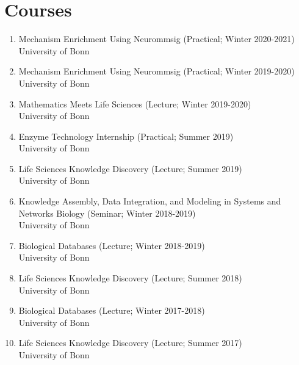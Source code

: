 \documentclass[11pt,a4paper,sans]{moderncv} %
\begin{document}
    \section{Courses}
    \begin{enumerate}
    \itemsep0.5em
        \item
            Mechanism Enrichment Using Neurommsig (Practical; Winter 2020-2021)\\
    {\scriptsize University of Bonn}

        \item
            Mechanism Enrichment Using Neurommsig (Practical; Winter 2019-2020)\\
    {\scriptsize University of Bonn}

        \item
            Mathematics Meets Life Sciences (Lecture; Winter 2019-2020)\\
    {\scriptsize University of Bonn}

        \item
            Enzyme Technology Internship (Practical; Summer 2019)\\
    {\scriptsize University of Bonn}

        \item
            Life Sciences Knowledge Discovery (Lecture; Summer 2019)\\
    {\scriptsize University of Bonn}

        \item
            Knowledge Assembly, Data Integration, and Modeling in Systems and Networks Biology (Seminar; Winter 2018-2019)\\
    {\scriptsize University of Bonn}

        \item
            Biological Databases (Lecture; Winter 2018-2019)\\
    {\scriptsize University of Bonn}

        \item
            Life Sciences Knowledge Discovery (Lecture; Summer 2018)\\
    {\scriptsize University of Bonn}

        \item
            Biological Databases (Lecture; Winter 2017-2018)\\
    {\scriptsize University of Bonn}

        \item
            Life Sciences Knowledge Discovery (Lecture; Summer 2017)\\
    {\scriptsize University of Bonn}


\end{enumerate}
\end{document}
